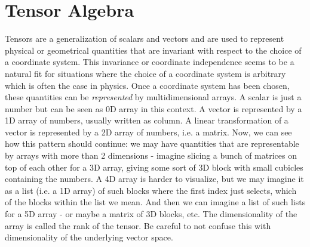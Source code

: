 \section{Tensor Algebra}
Tensors are a generalization of scalars and vectors and are used to represent physical or geometrical quantities that are invariant with respect to the choice of a coordinate system. This invariance or coordinate independence seems to be a natural fit for situations where the choice of a coordinate system is arbitrary which is often the case in physics. Once a coordinate system has been chosen, these quantities can be \emph{represented} by multidimensional arrays. A scalar is just a number but can be seen as 0D array in this context. A vector is represented by a 1D array of numbers, usually written as column. A linear transformation of a vector is represented by a 2D array of numbers, i.e. a matrix. Now, we can see how this pattern should continue: we may have quantities that are representable by arrays with more than 2 dimensions - imagine slicing a bunch of matrices on top of each other for a 3D array, giving some sort of 3D block with small cubicles containing the numbers. A 4D array is harder to visualize, but we may imagine it as a list (i.e. a 1D array) of such blocks where the first index just selects, which of the blocks within the list we mean. And then we can imagine a list of such lists for a 5D array - or maybe a matrix of 3D blocks, etc. The dimensionality of the array is called the rank of the tensor. Be careful to not confuse this with dimensionality of the underlying vector space.





